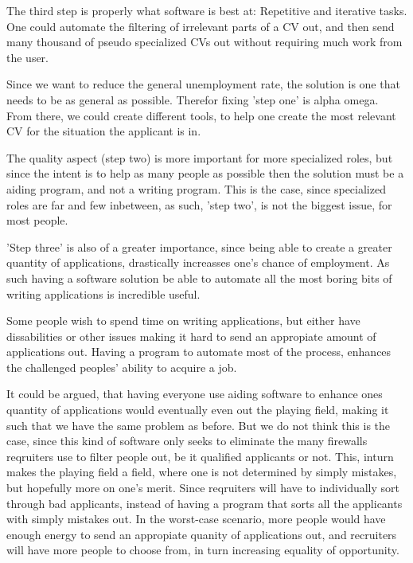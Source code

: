 The third step is properly what software is best at: Repetitive and iterative
tasks.
One could automate the filtering of irrelevant parts of a CV out, and then send
many thousand of pseudo specialized CVs out without requiring much work from the
user.

Since we want to reduce the general unemployment rate, the solution is one that needs to 
be as general as possible. Therefor fixing 'step one' is alpha omega.
From there, we could create different tools, to help one create the most relevant
CV for the situation the applicant is in.

The quality aspect (step two) is more important for more specialized roles, 
but since the intent is to help as many people as possible then the solution
must be a aiding program, and not a writing program.
This is the case, since specialized roles are far and few inbetween,
as such, 'step two', is not the biggest issue, for most people. 

'Step three' is also of a greater importance, since being able to create a
greater quantity of applications, drastically increasses one's chance of
employment. 
As such having a software solution be able to automate all the most boring
bits of writing applications is incredible useful.

Some people wish to spend time on writing applications, but either have
dissabilities or other issues making it hard to send an appropiate amount
of applications out. Having a program to automate most of the process, enhances
the challenged peoples' ability to acquire a job.

It could be argued, that having everyone use aiding software to enhance ones
quantity of applications would eventually even out the playing field, making
it such that we have the same problem as before. 
But we do not think this is the case, since this kind of software only seeks
to eliminate the many firewalls reqruiters use to filter people out, be it 
qualified applicants or not.
This, inturn makes the playing field a field, where one is not determined by
simply mistakes, but hopefully more on one's merit. Since reqruiters will have to 
individually sort through bad applicants, instead of having a program that sorts
all the applicants with simply mistakes out. In the worst-case scenario, more
people would have enough energy to send an appropiate quanity of applications
out, and recruiters will have more people to choose from, in turn increasing
equality of opportunity.


